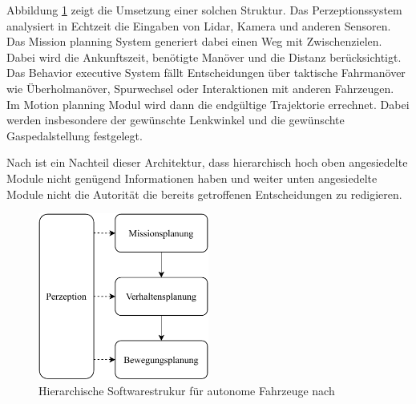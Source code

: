 Abbildung \ref{abb:hir} zeigt die Umsetzung einer solchen Struktur. Das Perzeptionssystem analysiert in Echtzeit die Eingaben von Lidar, Kamera und anderen Sensoren. Das Mission planning System generiert dabei einen Weg mit Zwischenzielen. Dabei wird die Ankunftszeit, benötigte  Manöver und die Distanz berücksichtigt. Das Behavior executive System fällt Entscheidungen über taktische Fahrmanöver wie Überholmanöver, Spurwechsel oder Interaktionen mit anderen Fahrzeugen. Im Motion planning Modul wird dann die endgültige Trajektorie errechnet. Dabei werden insbesondere der gewünschte  Lenkwinkel und die gewünschte Gaspedalstellung festgelegt.

Nach \cite{JUN14} ist ein Nachteil dieser Architektur, dass hierarchisch hoch oben angesiedelte Module nicht genügend Informationen haben und weiter unten angesiedelte Module nicht die Autorität die bereits getroffenen Entscheidungen zu redigieren.
\FloatBarrier
\begin{figure}[h]
  \centering
  \includegraphics[width=0.5\textwidth]{images/stand_der_technik/hierarchische_struktur.pdf}
  \caption[Hierarchische Softwarestrukur f\"ur autonome Fahrzeuge]{Hierarchische Softwarestrukur f\"ur autonome Fahrzeuge nach \cite{JUN14}}
  \label{abb:hir}
\end{figure}
\FloatBarrier
